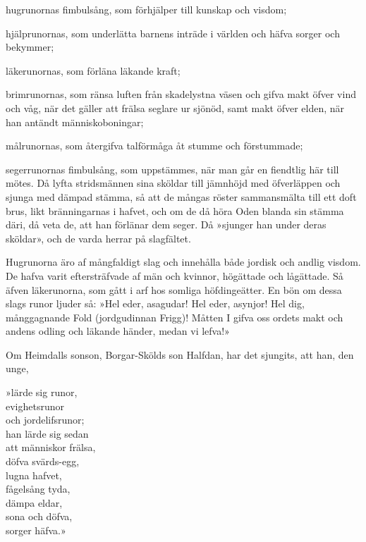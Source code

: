 hugrunornas fimbulsång, som förhjälper till kunskap och visdom;

hjälprunornas, som underlätta barnens inträde i världen och häfva sorger
och bekymmer;

läkerunornas, som förläna läkande kraft;

brimrunornas, som ränsa luften från skadelystna väsen
\protect\hypertarget{lb1625905.xhtmlux5cux23start24}{}{}\protect\hypertarget{lb1625905.xhtmlux5cux23start24-a}{}{}\protect\hypertarget{lb1625905.xhtmlux5cux23start24-b}{}{}\protect\hypertarget{lb1625905.xhtmlux5cux23start24-c}{}{}\protect\hypertarget{lb1625905.xhtmlux5cux23start24-d}{}{}
och gifva makt öfver vind och våg, när det gäller att frälsa seglare ur
sjönöd, samt makt öfver elden, när han antändt människoboningar;

målrunornas, som återgifva talförmåga åt stumme och förstummade;

segerrunornas fimbulsång, som uppstämmes, när man går en fiendtlig här
till mötes. Då lyfta stridsmännen sina sköldar till jämnhöjd med
öfverläppen och sjunga med dämpad stämma, så att de mångas röster
sammansmälta till ett doft brus, likt bränningarnas i hafvet, och om de
då höra Oden blanda sin stämma däri, då veta de, att han förlänar dem
seger. Då »sjunger han under deras sköldar», och de varda herrar på
slagfältet.

Hugrunorna äro af mångfaldigt slag och innehålla både jordisk och andlig
visdom. De hafva varit eftersträfvade af män och kvinnor, högättade och
lågättade. Så äfven läkerunorna, som gått i arf hos somliga
höfdingeätter. En bön om dessa slags runor ljuder så: »Hel eder,
asagudar! Hel eder, asynjor! Hel dig, månggagnande Fold (jordgudinnan
Frigg)! Måtten I gifva oss ordets makt och andens odling och läkande
händer, medan vi lefva!»

Om Heimdalls sonson, Borgar-Skölds son Halfdan, har det sjungits, att
han, den unge,

{»lärde sig runor,}\\
{evighetsrunor}\\
{och jordelifsrunor;}\\
{han lärde sig sedan}\\
{att människor frälsa,}\\
{döfva svärds-egg,}\\
{lugna hafvet,}\\
{fågelsång tyda,}\\
{dämpa eldar,}\\
{sona och döfva,}\\
{sorger häfva.»}\\

